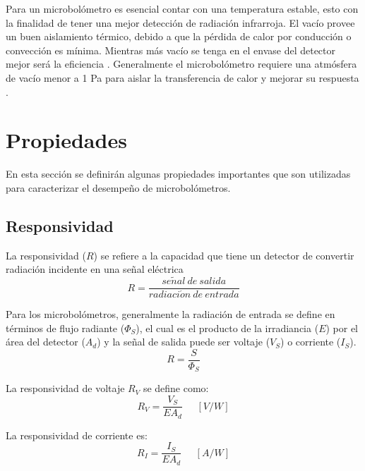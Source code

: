 Para un microbolómetro es esencial contar con una temperatura estable, esto con la finalidad de tener una mejor detección de radiación infrarroja. El vacío provee un buen aislamiento térmico, debido a que la pérdida de calor por conducción o convección es mínima. Mientras más vacío se tenga en el envase del detector mejor será la eficiencia \cite{Lau2010}.
Generalmente el microbolómetro requiere una atmósfera de vacío menor a 1 Pa para aislar la transferencia de calor y mejorar su respuesta \cite{Liu2020}.


    \section{Propiedades}
    En esta sección se definirán algunas propiedades importantes que son utilizadas para caracterizar el desempeño de microbolómetros.
        \subsection{Responsividad}
        La responsividad ($R$) se refiere a la capacidad que tiene un detector de convertir radiación incidente en una señal eléctrica
        \begin{equation}
        R = \frac{se\tilde{n}al\ de\ salida}{radiaci\acute{o}n\ de\ entrada}
        \label{eq:Responsivity}
        \end{equation}
        
        Para los microbolómetros, generalmente la radiación de entrada se define en términos de flujo radiante ($\Phi_{S}$), el cual es el producto de la irradiancia ($E$) por el área del detector ($A_{d}$) y la señal de salida  puede ser voltaje ($V_{S}$) o corriente ($I_{S}$).
        \begin{equation}
        R = \frac{S}{\Phi_{S}}
        \label{eq:Responsividad}
        \end{equation}
        
        La responsividad de voltaje $R_{V}$ se define como:
        \begin{equation}
        R_{V} = \frac{V_{S}}{EA_{d}}\phantom{abc} [V/W]
        \label{eq:Rv}
        \end{equation}
        
        La responsividad de corriente es:
        \begin{equation}
        R_{I} = \frac{I_{S}}{EA_{d}}\phantom{abc} [A/W]
        \label{eq:Ri}
        \end{equation}
        
